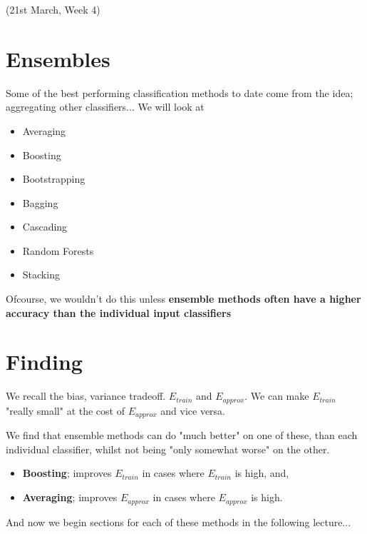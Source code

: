 \documentclass{article}
\begin{document}
(21st March, Week 4)
\section{Ensembles}
Some of the best performing classification methods to date come from the idea; aggregating other classifiers... We will look at

\begin{itemize}
	\item Averaging
	\item Boosting
	\item Bootstrapping
	\item Bagging
	\item Cascading
	\item Random Forests
	\item Stacking
\end{itemize}

Ofcourse, we wouldn't do this unless {\bf ensemble methods often have a higher accuracy than the individual input classifiers}

\section{Finding}
We recall the bias, variance tradeoff. $E_{train}$ and $E_{approx}$. We can make $E_{train}$ "really small" at the cost of $E_{approx}$ and vice versa.

We find that ensemble methods can do "much better" on one of these, than each individual classifier, whilst not being "only somewhat worse" on the other.

\begin{itemize}
	\item {\bf Boosting}; improves $E_{train}$ in cases where $E_{train}$ is high, and, 
	\item {\bf Averaging}; improves $E_{approx}$ in cases where $E_{approx}$ is high.
\end{itemize}

And now we begin sections for each of these methods in the following lecture...
\end{document}
